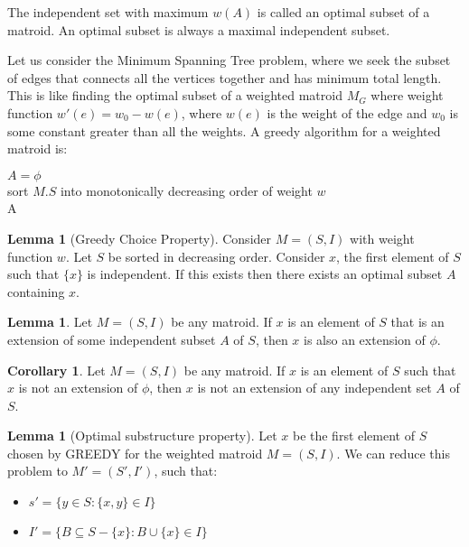 \documentclass[12pt,letterpaper]{article}
\theoremstyle{definition}
\newtheorem{corollary}{Corollary}[theorem] %
\newtheorem{lemma}[theorem]{Lemma} %
\begin{document}
The independent set with maximum $w(A)$ is called an optimal subset of a matroid. An optimal subset is always a maximal independent subset.

Let us consider the Minimum Spanning Tree problem, where we seek the subset of edges that connects all the vertices together and has minimum total length. This is like finding the optimal subset of a weighted matroid $M_G$ where weight function $w'(e) = w_0 - w(e)$, where $w(e)$ is the weight of the edge and $w_0$ is some constant greater than all the weights. A greedy algorithm for a weighted matroid is:


\begin{algorithm}[H]
  \SetAlgoLined
  $A = \phi$ \\
  sort $M.S$ into monotonically decreasing order of weight $w$  \\
  \Return A \\
  \caption{Greedy(M,w)}
\end{algorithm}

\begin{lemma}[Greedy Choice Property]
  Consider $M = (S,I)$ with weight function $w$. Let $S$ be sorted in decreasing order. Consider $x$, the first element of $S$ such that $\{x\} $ is independent. If this exists then there exists an optimal subset $A$ containing $x$.
\end{lemma}

\begin{lemma}
  Let $M = (S,I)$ be any matroid. If $x$ is an element of $S$ that is an extension of some independent subset $A$ of $S$, then $x$ is also an extension of $\phi$. 
\end{lemma}

\begin{corollary}
  Let $M = (S,I)$ be any matroid. If $x$ is an element of $S$ such that $x$ is not an extension of $\phi$, then $x$ is not an extension of any independent set $A$ of $S$. 
\end{corollary}

\begin{lemma}[Optimal substructure property]
  Let $x$ be the first element of $S$ chosen by GREEDY for the weighted matroid $M = (S,I)$. We can reduce this problem to $M' = (S',I')$, such that:
  \begin{itemize}
    \item $s' = \{y \in S : \{x,y\} \in I\}$
    \item $I' = \{B \subseteq S - \{x\} : B \cup \{x\} \in I\}$
  \end{itemize}
\end{lemma}
\end{document}
